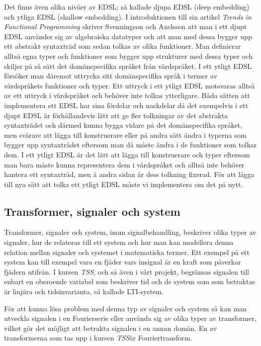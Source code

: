 \documentclass[12pt,a4paper,twoside,openright]{article}
\begin{document}
Det finns även olika nivåer av EDSL; så kallade djupa EDSL (deep
embedding) och ytliga EDSL (shallow embedding). I introduktionen till
sin artikel \textit{Trends in Functional Programming} skriver Svenningson och Axelsson \cite{Svenningsson2013}
att man i ett djupt EDSL använder sig av algebraiska datatyper och att
man med dessa bygger upp ett abstrakt syntaxträd som sedan tolkas av
olika funktioner. Man definierar alltså egna typer och funktioner som
bygger upp strukturer med dessa typer och skiljer på så sätt det
domänspecifika språket från värdspråket. I ett ytligt EDSL försöker
man däremot uttrycka sitt domänspecifika språk i termer av
värdspråkets funktioner och typer. Ett uttryck i ett ytligt EDSL
motsvaras alltså av ett uttryck i värdspråket och behöver inte tolkas
ytterligare. Båda sätten att implementera ett EDSL har sina fördelar
och nackdelar då det exempelvis i ett djupt EDSL är förhållandevis
lätt att ge fler tolkningar av det abstrakta syntaxträdet och därmed
kunna bygga vidare på det domänspecifika språket, men svårare att
lägga till konstruerare eller på andra sätt ändra i typerna som bygger
upp syntaxträdet eftersom man då måste ändra i de funktioner som
tolkar dem. I ett ytligt EDSL är det lätt att lägga till konstruerare
och typer eftersom man bara måste kunna representera dem i värdspråket
och alltså inte behöver hantera ett syntaxträd, men å andra sidan är
dess tolkning fixerad. För att lägga till nya sätt att tolka ett
ytligt EDSL måste vi implementera om det på nytt.

\subsection{Transformer, signaler och system}
Transformer, signaler och system, inom signalbehandling, beskriver
olika typer av signaler, hur de relateras till ett system och hur man
kan modellera denna relation mellan signaler och systemet i
matematiska termer. Ett exempel på ett system kan till exempel vara en
fjäder vars insignal är en kraft som påverkar fjädern utifrån. I
kursen \textit{TSS}, och så även i vårt projekt, begränsas signalen
till enbart en oberoende variabel som beskriver tid och de system som
som betraktas är linjära och tidsinvarianta, så kallade LTI-system.

För att kunna lösa problem med denna typ av signaler och system så kan
man utveckla signalen i en Fourierserie eller använda sig av olika	
typer av transformer, vilket gör det möjligt att betrakta signalen i
en annan domän. %
En av transformerna som tas upp i kursen \textit{TSS}är Fouriertransform.
\end{document}
